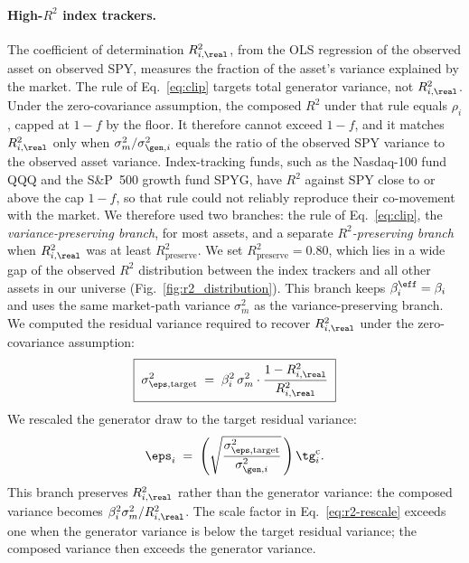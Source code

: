 \paragraph{High-$R^2$ index trackers.}

The coefficient of determination $R^2_{i,\real}$, from the OLS
regression of the observed asset on observed SPY, measures the
fraction of the asset's variance explained by the market. The rule of
Eq.~\eqref{eq:clip} targets total generator variance, not
$R^2_{i,\real}$. Under the zero-covariance
assumption, the composed $R^2$ under that rule equals $\rho_i$, capped
at $1-f$ by the floor. It therefore cannot exceed $1-f$, and it matches $R^2_{i,\real}$ only
when $\sigma_m^2/\sigma_{\gen,i}^2$ equals the ratio of the observed SPY
variance to the observed asset variance. Index-tracking funds, such as the Nasdaq-100 fund QQQ and the
S\&P~500 growth fund SPYG, have $R^2$ against SPY close to or above
the cap $1-f$, so that rule could not reliably reproduce their co-movement with the
market. We therefore used two branches: the rule of
Eq.~\eqref{eq:clip}, the \emph{variance-preserving branch}, for most
assets, and a separate \emph{$R^2$-preserving branch} when
$R^2_{i,\real}$ was at least $R^2_{\mathrm{preserve}}$. We set $R^2_{\mathrm{preserve}}=0.80$,
which lies in a wide gap of the observed $R^2$ distribution between
the index trackers and all other assets in our universe
(Fig.~\ref{fig:r2_distribution}). This branch keeps $\beta_i^{\eff}=\beta_i$ and uses the same
market-path variance $\sigma_m^2$ as the variance-preserving branch.
We computed the residual variance required to recover $R^2_{i,\real}$
under the zero-covariance
assumption:
\begin{equation}
  \boxed{\;\sigma_{\eps,\mathrm{target}}^2 \;=\; \beta_i^2\, \sigma_m^2 \cdot
    \frac{1 - R^2_{i,\real}}{R^2_{i,\real}}\;}
  \label{eq:r2-target}
\end{equation}
We rescaled the generator draw to the target residual variance:
\begin{equation}
  \eps_i \;=\; \left(\sqrt{\frac{\sigma_{\eps,\mathrm{target}}^2}{\sigma_{\gen,i}^2}}\,\right)\tg_i^{\mathrm c}.
  \label{eq:r2-rescale}
\end{equation}
This branch preserves $R^2_{i,\real}$ rather than the generator
variance: the composed variance becomes
$\beta_i^2\sigma_m^2/R^2_{i,\real}$. The scale factor in Eq.~\eqref{eq:r2-rescale} exceeds one when the generator variance is below the target residual
variance; the composed variance then exceeds the generator variance.

